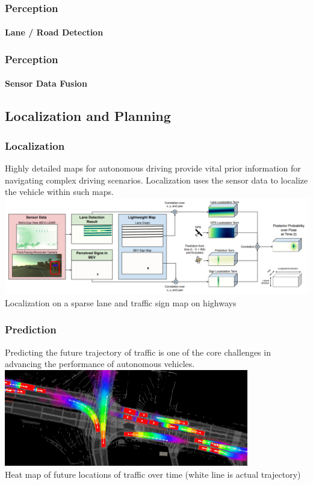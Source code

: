 \begin{frame}
\frametitle{Perception}
\framesubtitle{Lane / Road Detection}

\end{frame}

\begin{frame}
\frametitle{Perception}
\framesubtitle{Sensor Data Fusion}

\end{frame}

\subsection{Localization and Planning}

\begin{frame}
\frametitle{Localization}
Highly detailed maps for autonomous driving provide vital prior information
for navigating complex driving scenarios. Localization uses the sensor data
to localize the vehicle within such maps.\\
\vspace{0.25cm}
\centering
\includegraphics[width=\textwidth]{images/uber_sparse_localization.png}\\
\footnotesize{Localization on a sparse lane and traffic sign map on highways \cite{Ma2019}}
\end{frame}

\begin{frame}
\frametitle{Prediction}
Predicting the future trajectory of traffic is one of the core challenges in
advancing the performance of autonomous vehicles.\\
\vspace{0.25cm}
\centering
\includegraphics[width=0.8\textwidth]{images/uber_prediction.png}\\
\vspace{0.2cm}
\footnotesize{Heat map of future locations of traffic over time
      (white line is actual trajectory) \cite{Casas2020}}
\end{frame}

